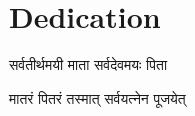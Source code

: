 \chapter*{Dedication}\label{ch:dedication}
सर्वतीर्थमयी माता सर्वदेवमयः पिता 

मातरं पितरं तस्मात् सर्वयत्नेन पूजयेत्
